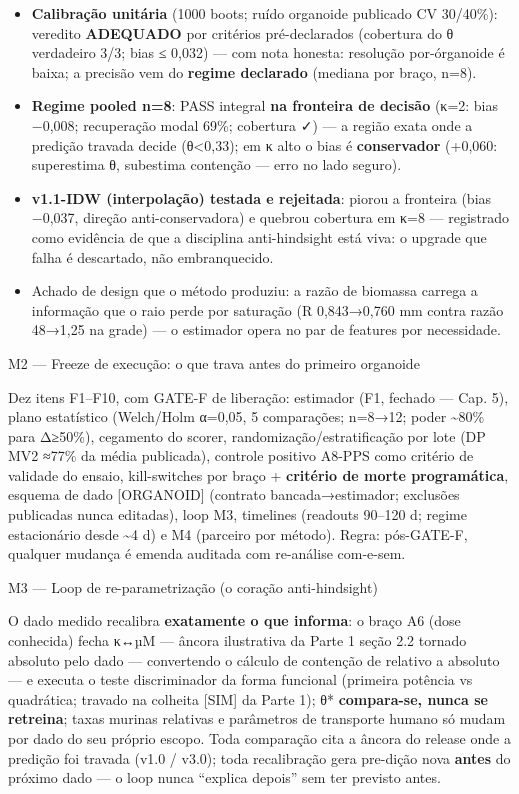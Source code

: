 \documentclass[12pt,a4paper,oneside]{report}
\providecommand{\tightlist}{\setlength{\itemsep}{2pt}\setlength{\parskip}{0pt}}
\begin{document}
\begin{itemize}
\tightlist
\item
  \textbf{Calibração unitária} (1000 boots; ruído organoide publicado CV
  30/40\%): veredito \textbf{ADEQUADO} por critérios pré-declarados
  (cobertura do θ verdadeiro 3/3; bias ≤ 0,032) --- com nota honesta:
  resolução por-órganoide é baixa; a precisão vem do \textbf{regime
  declarado} (mediana por braço, n=8).
\item
  \textbf{Regime pooled n=8}: PASS integral \textbf{na fronteira de
  decisão} (κ=2: bias −0,008; recuperação modal 69\%; cobertura ✓) --- a
  região exata onde a predição travada decide (θ\textless0,33); em κ
  alto o bias é \textbf{conservador} (+0,060: superestima θ, subestima
  contenção --- erro no lado seguro).
\item
  \textbf{v1.1-IDW (interpolação) testada e rejeitada}: piorou a
  fronteira (bias −0,037, direção anti-conservadora) e quebrou cobertura
  em κ=8 --- registrado como evidência de que a disciplina
  anti-hindsight está viva: o upgrade que falha é descartado, não
  embranquecido.
\item
  Achado de design que o método produziu: a razão de biomassa carrega a
  informação que o raio perde por saturação (R 0,843→0,760 mm contra
  razão 48→1,25 na grade) --- o estimador opera no par de features por
  necessidade.
\end{itemize}

M2 --- Freeze de execução: o que trava antes do primeiro organoide

Dez itens F1--F10, com GATE-F de liberação: estimador (F1, fechado ---
Cap. 5), plano estatístico (Welch/Holm α=0,05, 5 comparações; n=8→12;
poder \textasciitilde80\% para Δ≥50\%), cegamento do scorer,
randomização/estratificação por lote (DP MV2 ≈77\% da média publicada),
controle positivo A8-PPS como critério de validade do ensaio,
kill-switches por braço + \textbf{critério de morte programática},
esquema de dado {[}ORGANOID{]} (contrato bancada→estimador; exclusões
publicadas nunca editadas), loop M3, timelines (readouts 90--120 d;
regime estacionário desde \textasciitilde4 d) e M4 (parceiro por
método). Regra: pós-GATE-F, qualquer mudança é emenda auditada com
re-análise com-e-sem.

M3 --- Loop de re-parametrização (o coração anti-hindsight)

O dado medido recalibra \textbf{exatamente o que informa}: o braço A6
(dose conhecida) fecha κ↔µM --- âncora ilustrativa da Parte 1 seção 2.2
tornado absoluto pelo dado --- convertendo o cálculo de contenção de
relativo a absoluto --- e executa o teste discriminador da forma
funcional (primeira potência vs quadrática; travado na colheita
{[}SIM{]} da Parte 1); θ* \textbf{compara-se, nunca se retreina}; taxas
murinas relativas e parâmetros de transporte humano só mudam por dado do
seu próprio escopo. Toda comparação cita a âncora do release onde a
predição foi travada (v1.0 / v3.0); toda recalibração gera pre-dição
nova \textbf{antes} do próximo dado --- o loop nunca ``explica depois''
sem ter previsto antes.
\end{document}
